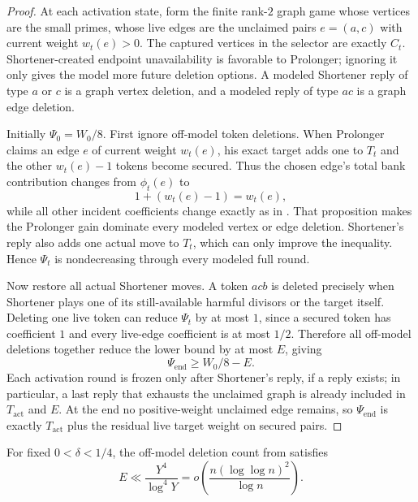 \begin{proof}
At each activation state, form the finite rank-$2$ graph game whose vertices are
the small primes, whose live edges are the unclaimed pairs $e=(a,c)$ with
current weight $w_t(e)>0$.  The captured vertices in the selector are exactly
$C_t$.  Shortener-created endpoint unavailability is favorable to Prolonger;
ignoring it only gives the model more future deletion options.  A modeled
Shortener reply of type $a$ or $c$ is a graph vertex deletion, and a modeled
reply of type $ac$ is a graph edge deletion.

Initially $\Psi_0=W_0/8$.  First ignore off-model token deletions.  When
Prolonger claims an edge $e$ of current weight $w_t(e)$, his exact target adds
one to $T_t$ and the other $w_t(e)-1$ tokens become secured.  Thus the chosen
edge's total bank contribution changes from $\phi_t(e)$ to
\[
  1+(w_t(e)-1)=w_t(e),
\]
while all other incident coefficients change exactly as in
.  That proposition makes the Prolonger gain
dominate every modeled vertex or edge deletion.  Shortener's reply also adds
one actual move to $T_t$, which can only improve the inequality.  Hence
$\Psi_t$ is nondecreasing through every modeled full round.

Now restore all actual Shortener moves.  A token $acb$ is deleted precisely
when Shortener plays one of its still-available harmful divisors or the target
itself.  Deleting one live token can reduce $\Psi_t$ by at most $1$, since a
secured token has coefficient $1$ and every live-edge coefficient is at most
$1/2$.
Therefore all off-model deletions together reduce the lower bound by at most
$E$, giving
\[
  \Psi_{\mathrm{end}}\ge W_0/8-E.
\]
Each activation round is frozen only after Shortener's reply, if a reply
exists; in particular, a last reply that exhausts the unclaimed graph is
already included in $T_{\mathrm{act}}$ and $E$.  At the end no positive-weight
unclaimed edge remains, so $\Psi_{\mathrm{end}}$ is exactly
$T_{\mathrm{act}}$ plus the residual live target weight on secured pairs.
\end{proof}

\begin{proposition}\label{prop:t2-deletion-budget}
For fixed $0<\delta<1/4$, the off-model deletion count from
 satisfies
\[
  E\ll \frac{Y^4}{\log^4 Y}
  =
  o\!\left(\frac{n(\log\log n)^2}{\log n}\right).
\]
\end{proposition}

